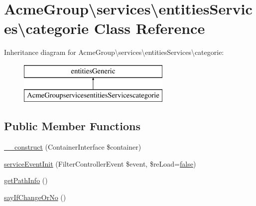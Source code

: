 \hypertarget{class_acme_group_1_1services_1_1entities_services_1_1categorie}{\section{Acme\+Group\textbackslash{}services\textbackslash{}entities\+Services\textbackslash{}categorie Class Reference}
\label{class_acme_group_1_1services_1_1entities_services_1_1categorie}
}
Inheritance diagram for Acme\+Group\textbackslash{}services\textbackslash{}entities\+Services\textbackslash{}categorie\+:\begin{figure}[H]
\begin{center}
\leavevmode
\includegraphics[height=2.000000cm]{class_acme_group_1_1services_1_1entities_services_1_1categorie}
\end{center}
\end{figure}
\subsection*{Public Member Functions}
\begin{DoxyCompactItemize}
\item 
\hyperlink{class_acme_group_1_1services_1_1entities_services_1_1categorie_a3c45c1572f7559034ac3bef99208e75f}{\+\_\+\+\_\+construct} (Container\+Interface \$container)
\item 
\hyperlink{class_acme_group_1_1services_1_1entities_services_1_1categorie_a571f472b64d08590bd8b1aa5fc452fc7}{service\+Event\+Init} (Filter\+Controller\+Event \$event, \$re\+Load=\hyperlink{validate_8js_a5df37b7f02e5cdc7d9412b7f872b8e01}{false})
\item 
\hyperlink{class_acme_group_1_1services_1_1entities_services_1_1categorie_a5a6a9ef2f588dd25f208dfd07bfa6afc}{get\+Path\+Info} ()
\item 
\hyperlink{class_acme_group_1_1services_1_1entities_services_1_1categorie_abf8e592b07ef0791bc9f7ccd7fdb11c1}{say\+If\+Change\+Or\+No} ()
\end{DoxyCompactItemize}
